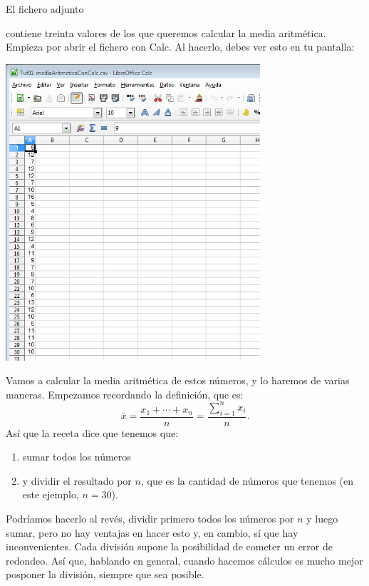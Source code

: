 \documentclass[10pt,a4paper]{article}\usepackage[]{graphicx}\usepackage[]{color}
\newcounter {cont01}
\begin{document}
El fichero adjunto
\begin{center}
\end{center}
contiene treinta valores de los que queremos calcular la media aritmética. Empieza por abrir el fichero con Calc.  Al hacerlo, debes ver esto en tu pantalla:
    \begin{center}
    \includegraphics[height=11cm]{../fig/Tut01-Calc-Formula-14.png}
    \end{center}
Vamos a calcular la media aritmética de estos números, y lo haremos de varias maneras. Empezamos recordando la definición, que es:
   \[\bar x=\dfrac{x_1+\cdots+x_n}{n}=\dfrac{\displaystyle\sum_{i=1}^nx_i}{n}.\]
Así que la receta dice que tenemos que:
\begin{enumerate}
  \item sumar todos los números
  \item y dividir el resultado por $n$, que es la cantidad de números que tenemos (en este ejemplo, $n=30$).
\end{enumerate}
Podríamos hacerlo al revés, dividir primero todos los números por $n$ y luego sumar, pero no hay ventajas en hacer esto y, en cambio, sí que hay inconvenientes. Cada división supone la posibilidad de cometer un error de redondeo. Así que, hablando en general, cuando hacemos cálculos es mucho mejor posponer la división, siempre que sea posible.
\end{document}
